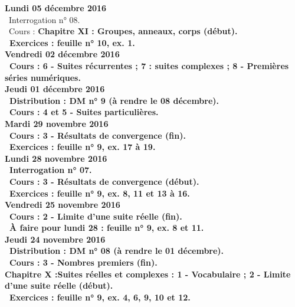 \documentclass[12pt,a4paper]{article}
\begin{document}
\noindent\textbf{Lundi 05 décembre 2016} \\
\bu\ Interrogation n° 08.\\
\bu\ Cours : \bf Chapitre XI \rm : Groupes, anneaux, corps (début).\\
\bu\ Exercices : feuille n° 10, ex. 1.\vspace{.4cm}\\
  
\noindent\textbf{Vendredi 02 décembre 2016}\\
\bu\ Cours : 6 - Suites récurrentes ; 7 : suites complexes ; 8 - Premières séries numériques.\vspace{.4cm}\\
  
\noindent\textbf{Jeudi 01 décembre 2016}\\
\bu\ Distribution : DM n° 9 (à rendre le 08 décembre).\\
\bu\ Cours : 4 et 5 - Suites particulières.\vspace{.4cm}\\

\noindent\textbf{Mardi 29 novembre 2016}\\
\bu\ Cours : 3 - Résultats de convergence (fin).\\
\bu\ Exercices : feuille n° 9, ex. 17 à 19.\vspace{.4cm}\\

\noindent\textbf{Lundi 28 novembre 2016} \\
\bu\ Interrogation n° 07.\\
\bu\ Cours : 3 - Résultats de convergence (début).\\
\bu\ Exercices : feuille n° 9, ex. 8, 11 et 13 à 16.\vspace{.4cm}\\

\noindent\textbf{Vendredi 25 novembre 2016}\\
\bu\ Cours : 2 - Limite d'une suite réelle (fin).\\
\bu\ À faire pour lundi 28 : feuille n° 9, ex. 8 et 11.\vspace{.4cm}\\

\noindent\textbf{Jeudi 24 novembre 2016}\\
\bu\ Distribution : DM n° 08 (à rendre le 01 décembre).\\
\bu\ Cours : 3 - Nombres premiers (fin).\\
\bf Chapitre X :\rm Suites réelles et complexes : 1 - Vocabulaire ; 2 - Limite 
d'une suite réelle (début).\\
\bu\ Exercices : feuille n° 9, ex. 4, 6, 9, 10 et 12.\vspace{.4cm}\\
\end{document}
